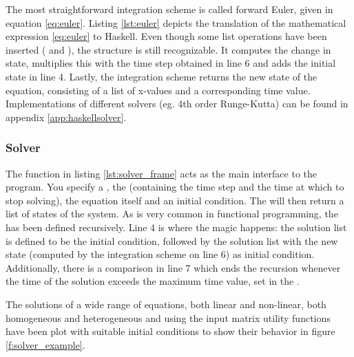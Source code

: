 The most straightforward integration scheme is called forward Euler, given in equation \ref{eq:euler}. Listing \ref{lst:euler} depicts the translation of the mathematical expression \ref{eq:euler} to Haskell. Even though some list operations have been inserted ( and ), the structure is still recognizable. It computes the change in state, multiplies this with the time step obtained in line 6 and adds the initial state in line 4. Lastly, the integration scheme returns the new state of the equation, consisting of a list of x-values and a corresponding time value. Implementations of different solvers (eg. 4th order Runge-Kutta) can be found in appendix \ref{app:haskellsolver}.



\subsubsection{Solver}
The  function in listing \ref{lst:solver_frame} acts as the main interface to the program. You specify a , the  (containing the time step and the time at which to stop solving), the equation itself and an initial condition. The  will then return a list of states of the system. As is very common in functional programming, the  has been defined recursively. Line 4 is where the magic happens: the solution list is defined to be the initial condition, followed by the solution list with the new state (computed by the integration scheme on line 6) as initial condition. Additionally, there is a comparison in line 7 which ends the recursion whenever the time of the solution exceeds the maximum time value, set in the .

The solutions of a wide range of equations, both linear and non-linear, both homogeneous and heterogeneous and using the input matrix utility functions have been plot with suitable initial conditions to show their behavior in figure \ref{f:solver_example}.



